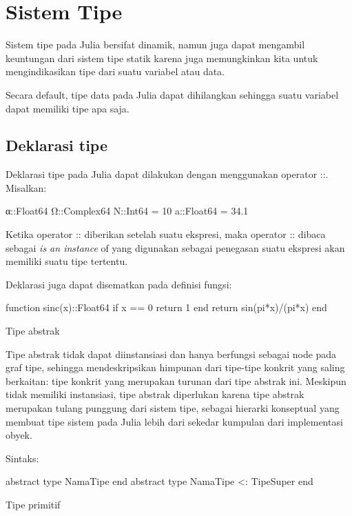 
\chapter{Sistem Tipe}

Sistem tipe pada Julia bersifat dinamik, namun juga dapat mengambil keuntungan dari
sistem tipe statik karena juga memungkinkan kita untuk mengindikasikan tipe dari
suatu variabel atau data.

Secara default, tipe data pada Julia dapat dihilangkan sehingga suatu variabel
dapat memiliki tipe apa saja.

\section{Deklarasi tipe}

Deklarasi tipe pada Julia dapat dilakukan dengan menggunakan operator ::.
Misalkan:

\begin{juliacode}
α::Float64
Ω::Complex64
N::Int64 = 10
a::Float64 = 34.1
\end{juliacode}

Ketika operator :: diberikan setelah suatu ekspresi, maka operator ::
dibaca sebagai \textit{is an instance} of yang digunakan sebagai penegasan suatu
ekspresi akan memiliki suatu tipe tertentu.

Deklarasi juga dapat disematkan pada definisi fungsi:

\begin{juliacode}
function sinc(x)::Float64
  if x == 0
    return 1
  end
  return sin(pi*x)/(pi*x)
end
\end{juliacode}

Tipe abstrak

Tipe abstrak tidak dapat diinstansiasi dan hanya berfungsi sebagai node pada
graf tipe, sehingga mendeskripsikan himpunan dari tipe-tipe konkrit yang saling
berkaitan: tipe konkrit yang merupakan turunan dari tipe abstrak ini.
Meskipun tidak memiliki instansiasi, tipe abstrak diperlukan karena tipe abstrak
merupakan tulang punggung dari sistem tipe, sebagai hierarki konseptual yang
membuat tipe sistem pada Julia lebih dari sekedar kumpulan dari implementasi obyek.

Sintaks:

\begin{juliacode}
abstract type NamaTipe end
abstract type NamaTipe <: TipeSuper end
\end{juliacode}

Tipe primitif


